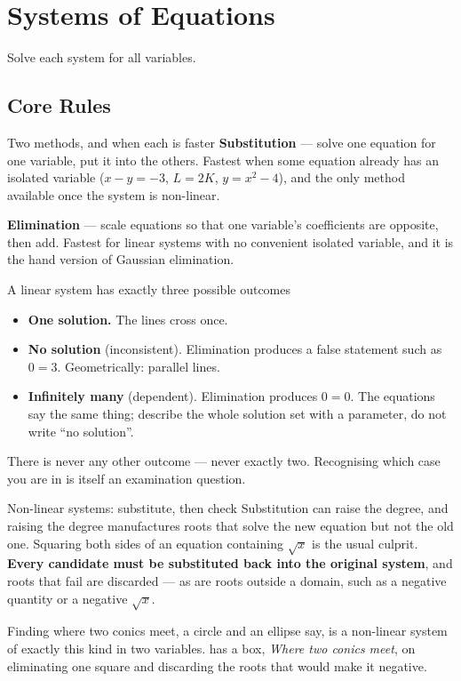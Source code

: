 \chapter{Systems of Equations}

Solve each system for all variables.

\section{Core Rules}

\begin{rulebox}{Two methods, and when each is faster}
\textbf{Substitution} --- solve one equation for one variable, put it into
the others. Fastest when some equation already has an isolated variable
($x-y=-3$, $L=2K$, $y=x^{2}-4$), and the only method available once the
system is non-linear.

\textbf{Elimination} --- scale equations so that one variable's coefficients
are opposite, then add. Fastest for linear systems with no convenient
isolated variable, and it is the hand version of Gaussian elimination.
\end{rulebox}

\begin{rulebox}{A linear system has exactly three possible outcomes}
\begin{itemize}[leftmargin=1.6em,itemsep=0.3ex]
  \item \textbf{One solution.} The lines cross once.
  \item \textbf{No solution} (inconsistent). Elimination produces a false
        statement such as $0=3$. Geometrically: parallel lines.
  \item \textbf{Infinitely many} (dependent). Elimination produces $0=0$.
        The equations say the same thing; describe the whole solution set
        with a parameter, do not write ``no solution''.
\end{itemize}
There is never any other outcome --- never exactly two. Recognising which
case you are in is itself an examination question.
\end{rulebox}

\begin{rulebox}{Non-linear systems: substitute, then check}
Substitution can raise the degree, and raising the degree manufactures roots
that solve the new equation but not the old one. Squaring both sides of an
equation containing $\sqrt{x}$ is the usual culprit. \textbf{Every candidate
must be substituted back into the original system}, and roots that fail are
discarded --- as are roots outside a domain, such as a negative quantity or
a negative $\sqrt{x}$.

Finding where two conics meet, a circle and an ellipse say, is a non-linear
system of exactly this kind in two variables.  has a box,
\emph{Where two conics meet}, on eliminating one square and discarding the
roots that would make it negative.
\end{rulebox}

